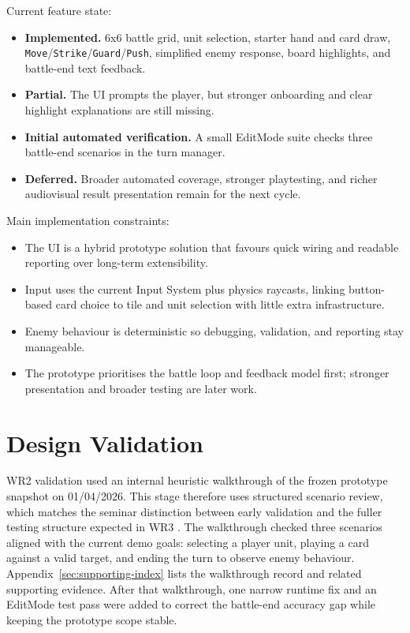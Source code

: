 Current feature state:

\begin{itemize}
\item \textbf{Implemented.} 6x6 battle grid, unit selection, starter hand and card draw, \texttt{Move}/\texttt{Strike}/\texttt{Guard}/\texttt{Push}, simplified enemy response, board highlights, and battle-end text feedback.
\item \textbf{Partial.} The UI prompts the player, but stronger onboarding and clear highlight explanations are still missing.
\item \textbf{Initial automated verification.} A small EditMode suite checks three battle-end scenarios in the turn manager.
\item \textbf{Deferred.} Broader automated coverage, stronger playtesting, and richer audiovisual result presentation remain for the next cycle.
\end{itemize}

Main implementation constraints:

\begin{itemize}
\item The UI is a hybrid prototype solution that favours quick wiring and readable reporting over long-term extensibility.
\item Input uses the current Input System plus physics raycasts, linking button-based card choice to tile and unit selection with little extra infrastructure.
\item Enemy behaviour is deterministic so debugging, validation, and reporting stay manageable.
\item The prototype prioritises the battle loop and feedback model first; stronger presentation and broader testing are later work.
\end{itemize}

\section{Design Validation}

WR2 validation used an internal heuristic walkthrough of the frozen prototype snapshot on 01/04/2026. This stage therefore uses structured scenario review, which matches the seminar distinction between early validation and the fuller testing structure expected in WR3 \cite{week6Seminar}. The walkthrough checked three scenarios aligned with the current demo goals: selecting a player unit, playing a card against a valid target, and ending the turn to observe enemy behaviour. Appendix~\ref{sec:supporting-index} lists the walkthrough record and related supporting evidence. After that walkthrough, one narrow runtime fix and an EditMode test pass were added to correct the battle-end accuracy gap while keeping the prototype scope stable.

